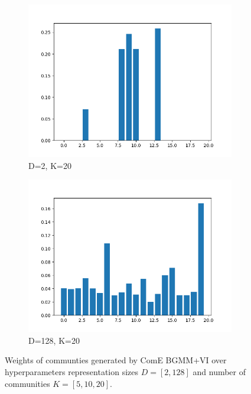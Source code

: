 \documentclass[conference]{IEEEtran}
\begin{document}
\begin{figure}[H]
\begin{subfigure}[b]{.5\linewidth}
        \includegraphics[width=1\linewidth]{images/eval/weights_BGMM_d2_k20.png}
        \caption{D=2, K=20}
        \label{fig:dblp_weights_d2_k20}
    \end{subfigure}%
    \begin{subfigure}[b]{.5\linewidth}
        \centering
        \includegraphics[width=1\linewidth]{images/eval/weights_BGMM_d128_k20.png}
        \caption{D=128, K=20}
        \label{fig:dblp_weights_d128_k20}
    \end{subfigure}

    \caption{Weights of communties generated by ComE BGMM+VI over hyperparameters representation sizes $D=[2, 128]$ and number of communities $K=[5, 10, 20]$.}
    \label{fig:dblp_weights}
\end{figure}
\end{document}
